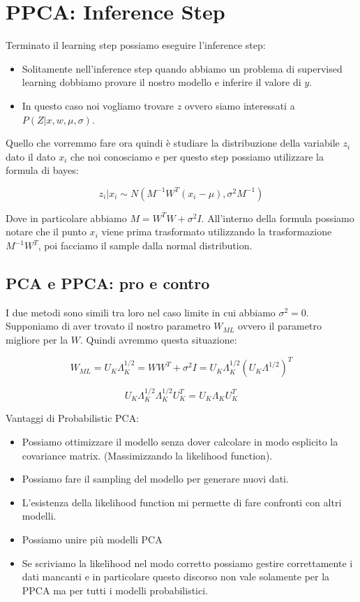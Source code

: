 \documentclass[14pt]{extreport}
\begin{document}
\section{PPCA: Inference Step}

Terminato il learning step possiamo eseguire l'inference step:
\begin{itemize}
	\item Solitamente nell'inference step quando abbiamo un problema di supervised learning dobbiamo provare il nostro modello e inferire 
	il valore di $y$.
	\item In questo caso noi vogliamo trovare $z$ ovvero siamo interessati a $P(Z|x, w, \mu, \sigma)$.
\end{itemize}

Quello che vorremmo fare ora quindi è studiare la distribuzione della variabile $z_i$ dato il dato $x_i$ che noi conosciamo e per questo step possiamo utilizzare
la formula di bayes:

$$z_i | x_i \sim N(M^{-1}W^{T}(x_i-\mu), \sigma^2M^{-1})$$

Dove in particolare abbiamo $M = W^TW + \sigma^2I$. All'interno della formula possiamo notare che il punto $x_i$ viene prima trasformato utilizzando la trasformazione
$M^{-1}W^{T}$, poi facciamo il sample dalla normal distribution.

\subsection{PCA e PPCA: pro e contro}

I due metodi sono simili tra loro nel caso limite in cui abbiamo $\sigma^2 = 0$.
Supponiamo di aver trovato il nostro parametro $W_{ML}$ ovvero il parametro migliore per la $W$. 
Quindi avremmo questa situazione:

$$W_{ML} = U_K\Lambda_K^{1/2} = WW^T + \sigma^2I = U_K\Lambda_K^{1/2}(U_K\Lambda^{1/2})^T$$

$$U_K\Lambda_K^{1/2}\Lambda_K^{1/2}U_{K}^{T} = U_K \Lambda_K U_K^T$$

Vantaggi di Probabilistic PCA:

\begin{itemize}
	\item Possiamo ottimizzare il modello senza dover calcolare in modo esplicito la covariance matrix. (Massimizzando la likelihood function).
	\item Possiamo fare il sampling del modello per generare nuovi dati.
	\item L'esistenza della likelihood function mi permette di fare confronti con altri modelli.
	\item Possiamo unire più modelli PCA
	\item Se scriviamo la likelihood nel modo corretto possiamo gestire correttamente i dati mancanti e in particolare questo discorso non vale solamente per la PPCA
	ma per tutti i modelli probabilistici.
\end{itemize}
\end{document}
